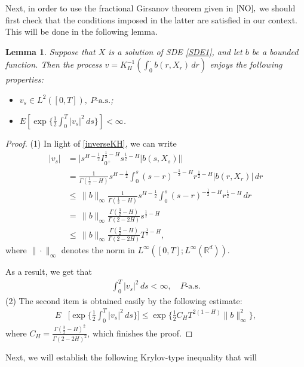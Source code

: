 \documentclass[numbers,compress,v1.0.1]{vmsta}
\def\R{{ \mathbb{R}}}
\newtheorem{lemma}[theorem]{Lemma}
\theoremstyle{definition}
\newcommand{\rrvert}{\vert}
\newcommand{\llvert}{\vert}
\begin{document}
Next, in order to use the fractional Girsanov theorem given in $\mbox
{\cite[Thm.~2]{NO},}$ we should first check that the conditions imposed
in the latter are
satisfied in our context. This will be done in the following lemma.
%
\begin{lemma}\label{gir}
Suppose that $X$ is a solution of SDE \eqref{SDE1}, and let $b$ be a
bounded function. Then the process
$v= K_H^{-1} ( \int_0^{\cdot} b(r, X_r) \,dr )$ enjoys the
following properties:
%
\begin{itemize}
%
\item[$(1)$] $v_s \in L^2([0,T]), \ P\text{-a.s.}$;
%
\item[$(2)$] $E [ \exp \{\frac{1}{2} \int_0^T |v_s|^2 \,ds \}  ] < \infty$.
\end{itemize}
%
\end{lemma}
%
\begin{proof}
(1) In light of \eqref{inverseKH}, we can write
%
\begin{align*}
|v_s| &= \bigl|s^{H-\frac{1}{2}} I_{0^+}^{\frac{1}{2}-H} s^{\frac{1}{2}-H} \bigl|b(s,X_s)\bigr| \bigr|\\
&= \frac{1}{\varGamma (\frac{1}{2}-H )} s^{H- \frac{1}{2}} \int_0^s(s-r)^{-\frac{1}{2}-H} r^{\frac{1}{2}-H} \bigl|b(r,X_r)\bigr|\,dr\\
&\leq \, \|b\|_\infty\frac{1}{\varGamma (\frac{1}{2}-H )} s^{H- \frac{1}{2}} \int_0^s (s-r)^{-\frac{1}{2}-H} r^{\frac{1}{2}-H}\,dr\\
&= \, \|b\|_\infty\frac{\varGamma (\frac{3}{2}-H )}{\varGamma(2-2H  )}s^{\frac{1}{2}-H}\\
&\leq\, \|b\|_\infty\frac{\varGamma (\frac{3}{2}-H )}{\varGamma(2-2H  )}T^{\frac{1}{2}-H},
\end{align*}
%
where $\|\cdot\|_{\infty}$ denotes the norm in $L^{\infty}([0,T];
L^\infty(\R^d))$.

As a result, we get that
%
\begin{align*}
\int_{0}^{T} |v_{s}|^2 \,ds
<\infty, \quad P\text{-a.s.}
\end{align*}
%
(2) The second item is obtained easily by the following estimate:
%
\begin{align*}
E& \Biggl[ \exp \Biggl\{\frac{1}{2} \int_0^T
\llvert v_s\rrvert ^2 \,ds \Biggr\} \Biggr] \leq\exp \biggl
\{ \frac{1}{2} C_H T^{2(1-H)} \|b\|_\infty
^2 \biggr\},
\end{align*}
%
where $C_H=\frac{\varGamma (\frac{3}{2}-H )^2}{\varGamma (2-2H
 )^2}$,
which finishes the proof.
\end{proof}
%
Next, we will establish the following Krylov-type inequality that will
\end{document}
